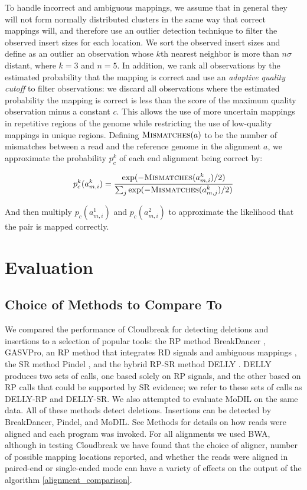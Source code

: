 \documentclass [11pt] {report}
\begin{document}
To handle incorrect and ambiguous mappings, we assume that in general they will not form normally distributed clusters in the same way that correct mappings will, and therefore use an outlier detection technique to filter the observed insert sizes for each location. We sort the observed insert sizes and define as an outlier an observation whose $k$th nearest neighbor is more than $n\sigma$ distant, where $k = 3$ and $n = 5$. In addition, we rank all observations by the estimated probability that the mapping is correct and use an \emph{adaptive quality cutoff} to filter observations: we discard all observations where the estimated probability the mapping is correct is less than the score of the maximum quality observation minus a constant $c$. This allows the use of more uncertain mappings in repetitive regions of the genome while restricting the use of low-quality mappings in unique regions. Defining $\textsc{Mismatches}(a)$ to be the number of mismatches between a read and the reference genome in the alignment $a$, we approximate the probability $p^{k}_c$ of each end alignment being correct by:

\[ p^{k}_c(a^{k}_{m,i}) = \frac{\exp({-\textsc{Mismatches}(a^{k}_{m,i})/2)}}{\sum_j{\exp(-\textsc{Mismatches}(a^{k}_{m,j})/2)}} \]

And then multiply $p_c(a^{1}_{m,i})$ and $p_c(a^{2}_{m,i})$ to approximate the likelihood that the pair is mapped correctly.

% 
\section{Evaluation}


\subsection{Choice of Methods to Compare To}

We compared the performance of Cloudbreak for detecting deletions and insertions to a selection of popular tools: the RP method BreakDancer \cite{Chen:2009p3}, GASVPro, an RP method that integrates RD signals and ambiguous mappings \cite{Sindi:2012kk}, the SR method Pindel \cite{Ye:2009p2}, and the hybrid RP-SR method DELLY \cite{Rausch:2012he}. DELLY produces two sets of calls, one based solely on RP signals, and the other based on RP calls that could be supported by SR evidence; we refer to these sets of calls as DELLY-RP and DELLY-SR. We also attempted to evaluate MoDIL on the same data. All of these methods detect deletions. Insertions can be detected by BreakDancer, Pindel, and MoDIL. See Methods for details on how reads were aligned and each program was invoked. For all alignments we used BWA, although in testing Cloudbreak we have found that the choice of aligner, number of possible mapping locations reported, and whether the reads were aligned in paired-end or single-ended mode can have a variety of effects on the output of the algorithm \ref{alignment_comparison}.
\end{document}
